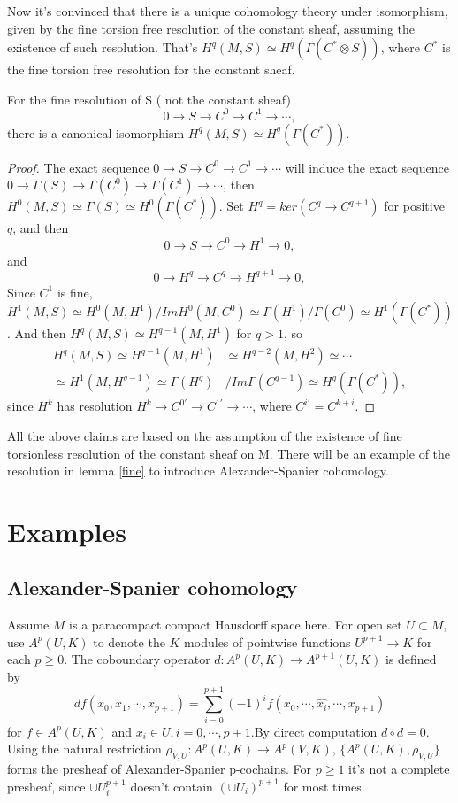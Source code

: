 \documentclass[twoside]{article}
\begin{document}
Now it's convinced that there is a unique cohomology theory under isomorphism, given by the fine torsion free resolution of the constant sheaf, assuming the existence of such resolution. That's $H^q(M,S)\simeq H^q(\Gamma(C^*\otimes S))$, where $C^*$ is the fine torsion free resolution for the constant sheaf.

\begin{theorem}\label{resdef}
For the fine resolution of S ( not the constant sheaf)   $$
0\to S\to C^0\to C^1\to \cdots,
$$
there is a  canonical isomorphism $H^q(M,S)\simeq H^q(\Gamma(C^*))$.
\end{theorem}

\begin{proof}
   The exact sequence $0\to S\to C^0\to C^1\to \cdots$ will induce the exact sequence  $0\to \Gamma(S)\to \Gamma(C^0)\to \Gamma(C^1)\to \cdots$, then $H^0(M,S)\simeq \Gamma(S)\simeq H^0(\Gamma(C^*))$.
  Set $H^q=ker(C^q\to C^{q+1})$ for positive $q$, and then
  $$
  0\to S \to C^0\to H^1\to 0,
  $$
   and
  $$
  0\to H^q\to C^q\to H^{q+1}\to 0,
  $$
 Since $C^1$ is fine, $H^1(M,S)\simeq H^0(M,H^1)/ImH^0(M,C^0)\simeq \Gamma(H^1)/\Gamma(C^0)\simeq H^1(\Gamma(C^*))$. And then
$H^q(M,S)\simeq H^{q-1}(M,H^1)$ for $q>1$, so
$$\begin{aligned}
H^q(M,S)\simeq H^{q-1}(M,H^1)&\simeq H^{q-2}(M,H^2)\simeq \cdots\\
\simeq H^1(M,H^{q-1})\simeq \Gamma(H^q)&/Im\Gamma(C^{q-1})\simeq H^q(\Gamma(C^*)),
\end{aligned}
$$
since $H^k$ has resolution $H^k\to C^{0\prime}\to C^{1\prime}\to \cdots$, where $C^{i\prime}=C^{k+i}$.
\end{proof}



\begin{remark}
  All the above claims are based on the assumption of the existence of fine torsionless resolution of the constant sheaf on M. There will be an example of the resolution in lemma \ref{fine} to introduce Alexander-Spanier cohomology.
\end{remark}
\section{Examples}
\subsection{Alexander-Spanier cohomology}
Assume $M$ is a paracompact compact Hausdorff space here. For open set $U\subset M$,  use $A^{p}(U,K)$ to denote the $K$ modules of pointwise functions $U^{p+1}\to K$ for each $p\geq 0$. The coboundary operator $d:A^{p}(U,K)\to A^{p+1}(U,K)$ is defined by $$
df(x_0,x_1,\cdots,x_{p+1})=\sum_{i=0}^{p+1}(-1)^if(x_0,\cdots,\hat{x_i},\cdots,x_{p+1})$$ for $f\in A^{p}(U,K)$ and $x_i\in U,i=0,\cdots,p+1$.By direct computation $d\circ d=0$. Using the natural restriction $\rho_{V,U}:A^{p}(U,K)\to A^{p}(V,K)$, $\{A^{p}(U,K),\rho_{V,U}\}$ forms the presheaf of Alexander-Spanier p-cochains. For $p\geq1$  it's not a complete presheaf, since  $\cup U_i^{p+1}$ doesn't contain $(\cup U_i)^{p+1}$ for most times.
\end{document}
